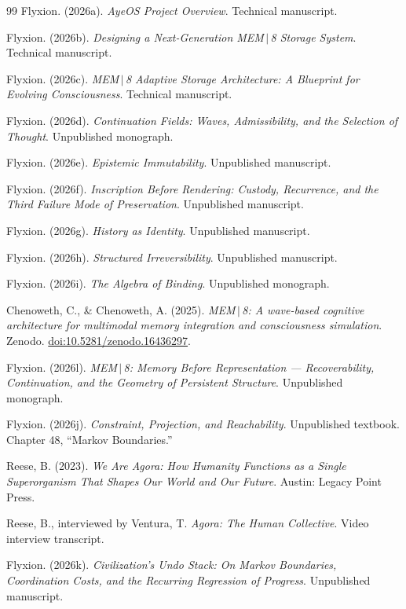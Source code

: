 \documentclass[11pt]{article}
\begin{document}
\begin{thebibliography}{99}
Flyxion. (2026a). \emph{AyeOS Project Overview}. Technical manuscript.

Flyxion. (2026b). \emph{Designing a Next-Generation MEM\,$|$\,8 Storage System}. Technical manuscript.

Flyxion. (2026c). \emph{MEM\,$|$\,8 Adaptive Storage Architecture: A Blueprint for Evolving Consciousness}. Technical manuscript.

Flyxion. (2026d). \emph{Continuation Fields: Waves, Admissibility, and the Selection of Thought}. Unpublished monograph.

Flyxion. (2026e). \emph{Epistemic Immutability}. Unpublished manuscript.

Flyxion. (2026f). \emph{Inscription Before Rendering: Custody, Recurrence, and the Third Failure Mode of Preservation}. Unpublished manuscript.

Flyxion. (2026g). \emph{History as Identity}. Unpublished manuscript.

Flyxion. (2026h). \emph{Structured Irreversibility}. Unpublished manuscript.

Flyxion. (2026i). \emph{The Algebra of Binding}. Unpublished monograph.

Chenoweth, C., \& Chenoweth, A. (2025). \emph{MEM\,$|$\,8: A wave-based cognitive architecture for multimodal memory integration and consciousness simulation}. Zenodo. \href{https://doi.org/10.5281/zenodo.16436297}{doi:10.5281/zenodo.16436297}.

Flyxion. (2026l). \emph{MEM\,$|$\,8: Memory Before Representation --- Recoverability, Continuation, and the Geometry of Persistent Structure}. Unpublished monograph.

Flyxion. (2026j). \emph{Constraint, Projection, and Reachability}. Unpublished textbook. Chapter 48, ``Markov Boundaries.''

Reese, B. (2023). \emph{We Are Agora: How Humanity Functions as a Single Superorganism That Shapes Our World and Our Future}. Austin: Legacy Point Press.

Reese, B., interviewed by Ventura, T. \emph{Agora: The Human Collective}. Video interview transcript.

Flyxion. (2026k). \emph{Civilization's Undo Stack: On Markov Boundaries, Coordination Costs, and the Recurring Regression of Progress}. Unpublished manuscript.

\end{thebibliography}
\end{document}
